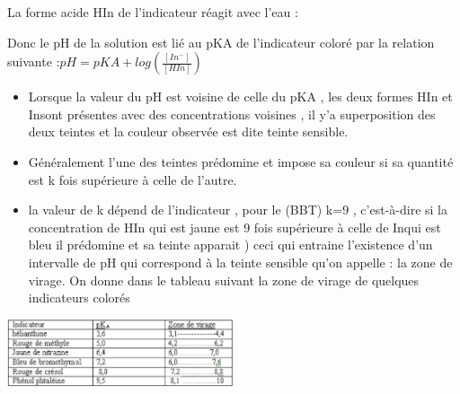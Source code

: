 \documentclass[12pt]{article}
\begin{document}
La forme acide HIn de l'indicateur réagit avec l'eau : 


Donc le pH de la solution est lié au pKA de l'indicateur coloré par la relation suivante :$pH = pKA + log({\frac{[In^-]}{[HIn]}})$


\begin{itemize}
	\item Lorsque la valeur du pH est voisine de celle du pKA , les deux formes HIn et Insont présentes avec des concentrations
voisines , il y'a superposition des deux teintes et la couleur observée est dite teinte sensible.

\item Généralement l'une des teintes prédomine et impose sa couleur si sa quantité est k fois supérieure à celle de l'autre.

\item  la valeur de k dépend de l'indicateur , pour le (BBT) k=9 , c'est-à-dire si la concentration de HIn qui est jaune est 9 fois
supérieure à celle de Inqui est bleu il prédomine et sa teinte apparait ) ceci qui entraine l'existence d'un intervalle de pH qui
correspond à la teinte sensible qu'on appelle : la zone de virage.
On donne dans le tableau suivant la zone de virage de quelques indicateurs colorés
\end{itemize}

\begin{center}
	\includegraphics[width=0.5\textwidth]{./img/table.png}
\end{center}








\end{document}
